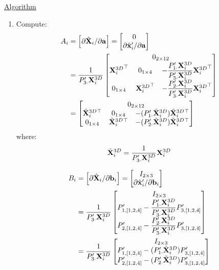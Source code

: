 \underline{Algorithm}
\renewcommand{\labelenumi}{(\roman{enumi})}
\begin{enumerate}
 \item Compute:
  \begin{align}
  \nonumber
  A_i &= \left[ \partial \bfXhat_i / \partial \bfa \right] =
 \begin{bmatrix} 0 \\ \partial \bfxhatp_i / \partial \bfa \end{bmatrix}\\
 &= \frac{1}{\Prow{3} \bfXDi}
 \begin{bmatrix} \multicolumn{3}{c}{\zero{2}{12}} \\ 
 \bfXDi^\top & \zero{1}{4} & -   \dfrac{\Prow{1} \bfXDi}{\Prow{3} \bfXDi} \bfXDi^\top \\
 \zero{1}{4} & \bfXDi^\top & -   \dfrac{\Prow{2} \bfXDi}{\Prow{3} \bfXDi} \bfXDi^\top \end{bmatrix}\\
 &= \begin{bmatrix} \multicolumn{3}{c}{\zero{2}{12}} \\
 \bfXDit^\top & \zero{1}{4} & -(\Prow{1} \bfXDit) \bfXDit^\top \\
 \zero{1}{4} & \bfXDit^\top & -(\Prow{2} \bfXDit) \bfXDit^\top \end{bmatrix}
 \end{align}
where: $${\tilde{\mathbf{X}}^{3D}_i}{}=\dfrac{1}{{P'_{3 \cdot}} {\mathbf{X}^{3D}_i}}{\mathbf{X}^{3D}_i}$$


 \begin{align}
  \nonumber
  B_i &= \left[ \partial \hat{\mathbf{X}}_i / \partial \mathbf{b}_i \right] =
 \begin{bmatrix} {I_{2 \times 3}} \\ \partial {\hat{\mathbf{x}}'}_i / \partial \mathbf{b}_i \end{bmatrix}\\
 &= \frac{1}{{P'_{3 \cdot}} {\mathbf{X}^{3D}_i}}
 \begin{bmatrix} {I_{2 \times 3}} \\
  {P'_{{1},{[1,2,4]}}}  - \dfrac{{P'_{1 \cdot}} {\mathbf{X}^{3D}_i}}{{P'_{3 \cdot}} {\mathbf{X}^{3D}_i}} {P'_{{3},{[1,2,4]}}} \\
  {P'_{{2},{[1,2,4]}}}  - \dfrac{{P'_{2 \cdot}} {\mathbf{X}^{3D}_i}}{{P'_{3 \cdot}} {\mathbf{X}^{3D}_i}} {P'_{{3},{[1,2,4]}}} 
 \end{bmatrix}\\
 &= \frac{1}{{P'_{3 \cdot}} {\mathbf{X}^{3D}_i}}
 \begin{bmatrix} {I_{2 \times 3}} \\
  {P'_{{1},{[1,2,4]}}}  - ({P'_{1 \cdot}} {\tilde{\mathbf{X}}^{3D}_i}{}) {P'_{{3},{[1,2,4]}}} \\
  {P'_{{2},{[1,2,4]}}}  - ({P'_{2 \cdot}} {\tilde{\mathbf{X}}^{3D}_i}{}) {P'_{{3},{[1,2,4]}}} 
 \end{bmatrix}
 \end{align}\\


\end{enumerate}
